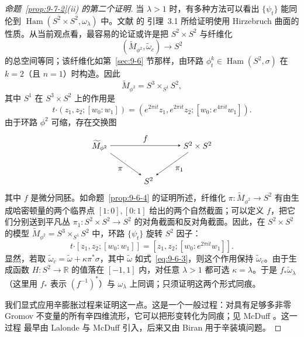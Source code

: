 \begin{proof}[命题~\ref{prop:9-7-2}(ii) 的第二个证明]
当 $\lambda>1$ 时，有多种方法可以看出 $\{\psi_t\}$ 能同伦到
$\operatorname{Ham}(S^2\times S^2,\omega_\lambda)$ 中。文献  的
引理~3.1 所给证明使用 Hirzebruch 曲面的性质。从当前观点看，最容易的论证或许是把
$S^2\times S^2$ 与纤维化
\[
  (\widetilde M_{\phi^2},\widetilde\omega_c)\longrightarrow S^2
\]
的总空间等同；该纤维化如第~\ref{sec:9-6} 节那样，由环路
$\phi_t^k\in\operatorname{Ham}(S^2,\sigma)$ 在 $k=2$（且 $n=1$）时构造。因此
\[
  \widetilde M_{\phi^2}=S^3\times_{S^1}S^2,
\]
其中 $S^1$ 在 $S^3\times S^2$ 上的作用是
\[
  t\mathbin{\boldsymbol\cdot}(z_1,z_2;[w_0:w_1])
  =(e^{2\pi it}z_1,e^{2\pi it}z_2;[w_0:e^{4\pi it}w_1]).
\]
由于环路 $\phi^2$ 可缩，存在交换图
\[
\begin{tikzpicture}[baseline=(current bounding box.center),>=stealth]
  \node (m) at (0,0) {$\widetilde M_{\phi^2}$};
  \node (prod) at (4.2,0) {$S^2\times S^2$};
  \node (base) at (2.1,-1.5) {$S^2$};
  \draw[->] (m) -- node[above] {$f$} (prod);
  \draw[->] (m) -- node[below left] {$\pi$} (base);
  \draw[->] (prod) -- node[below right] {$\pi_1$} (base);
\end{tikzpicture}
\]
其中 $f$ 是微分同胚。如命题~\ref{prop:9-6-4} 的证明所述，纤维化
$\pi:\widetilde M_{\phi^2}\to S^2$ 有由生成哈密顿量的两个临界点
$[1:0],[0:1]$ 给出的两个自然截面；可以定义 $f$，把它们分别送到平凡丛
$\pi_1:S^2\times S^2\to S^2$ 的对角截面和反对角截面。因此，在
$S^2\times S^2$ 的模型 $\widetilde M_{\phi^2}=S^3\times_{S^1}S^2$ 中，环路
$\{\psi_t\}$ 旋转 $S^2$ 因子：
\[
  t\mathbin{\boldsymbol\cdot}[z_1,z_2;[w_0:w_1]]
  =[z_1,z_2;[w_0:e^{2\pi it}w_1]].
\]
显然，若取
$\widetilde\omega_c=\widetilde\omega+\kappa\pi^*\sigma$，其中
$\widetilde\omega$ 如式~\eqref{eq:9-6-3}，则这个作用保持 $\widetilde\omega_c$。由于生成函数
$H:S^2\to\mathbb R$ 的值落在 $[-1,1]$ 内，对任意 $\lambda>1$ 都可选
$\kappa=\lambda$。于是 $f_*\widetilde\omega_\lambda$（这里用 $f_*$ 表示
$(f^{-1})^*$）与 $\omega_\lambda$ 上同调；只须证明这两个形式同痕。

我们显式应用辛膨胀过程来证明这一点。这是一个一般过程：对具有足够多非零 Gromov
不变量的所有辛四维流形，它可以把形变转化为同痕；见 McDuff 。这一过程
最早由 Lalonde 与 McDuff  引入，后来又由 Biran
 用于辛装填问题。


\end{proof}

